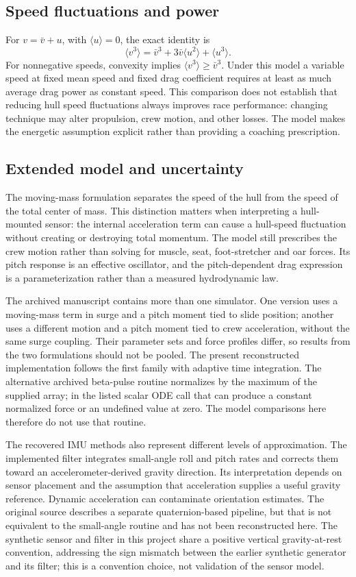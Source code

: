 \documentclass[11pt]{article}
\begin{document}
\subsection{Speed fluctuations and power}
For $v=\bar v+u$, with $\langle u\rangle=0$, the exact identity is
\begin{equation}\langle v^3\rangle=\bar v^3+3\bar v\langle u^2\rangle+\langle u^3\rangle.\end{equation}
For nonnegative speeds, convexity implies $\langle v^3\rangle\geq\bar v^3$. Under this model a variable speed at fixed mean speed and fixed drag coefficient requires at least as much average drag power as constant speed. This comparison does not establish that reducing hull speed fluctuations always improves race performance: changing technique may alter propulsion, crew motion, and other losses. The model makes the energetic assumption explicit rather than providing a coaching prescription.

\subsection{Extended model and uncertainty}
The moving-mass formulation separates the speed of the hull from the speed of the total center of mass. This distinction matters when interpreting a hull-mounted sensor: the internal acceleration term can cause a hull-speed fluctuation without creating or destroying total momentum. The model still prescribes the crew motion rather than solving for muscle, seat, foot-stretcher and oar forces. Its pitch response is an effective oscillator, and the pitch-dependent drag expression is a parameterization rather than a measured hydrodynamic law.

The archived manuscript contains more than one simulator. One version uses a moving-mass term in surge and a pitch moment tied to slide position; another uses a different motion and a pitch moment tied to crew acceleration, without the same surge coupling. Their parameter sets and force profiles differ, so results from the two formulations should not be pooled. The present reconstructed implementation follows the first family with adaptive time integration. The alternative archived beta-pulse routine normalizes by the maximum of the supplied array; in the listed scalar ODE call that can produce a constant normalized force or an undefined value at zero. The model comparisons here therefore do not use that routine.

The recovered IMU methods also represent different levels of approximation. The implemented filter integrates small-angle roll and pitch rates and corrects them toward an accelerometer-derived gravity direction. Its interpretation depends on sensor placement and the assumption that acceleration supplies a useful gravity reference. Dynamic acceleration can contaminate orientation estimates. The original source describes a separate quaternion-based pipeline, but that is not equivalent to the small-angle routine and has not been reconstructed here. The synthetic sensor and filter in this project share a positive vertical gravity-at-rest convention, addressing the sign mismatch between the earlier synthetic generator and its filter; this is a convention choice, not validation of the sensor model.
\end{document}
